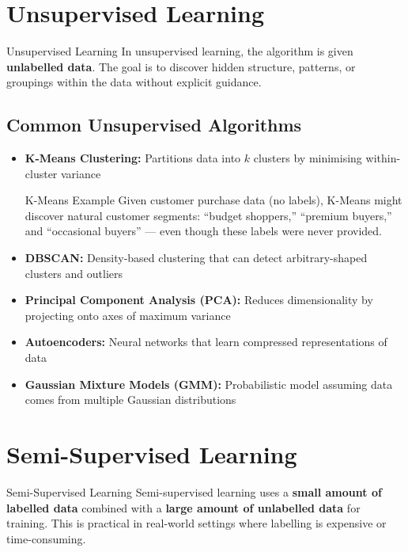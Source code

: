 \documentclass[12pt,a4paper]{report}
\begin{document}
\section{Unsupervised Learning}

\begin{defbox}{Unsupervised Learning}
In unsupervised learning, the algorithm is given \textbf{unlabelled data}. The goal is to discover hidden structure, patterns, or groupings within the data without explicit guidance.
\end{defbox}

\subsection{Common Unsupervised Algorithms}

\begin{itemize}
  \item \textbf{K-Means Clustering:} Partitions data into $k$ clusters by minimising within-cluster variance

    \begin{examplebox}{K-Means Example}
    Given customer purchase data (no labels), K-Means might discover natural customer segments: ``budget shoppers,'' ``premium buyers,'' and ``occasional buyers'' --- even though these labels were never provided.
    \end{examplebox}

  \item \textbf{DBSCAN:} Density-based clustering that can detect arbitrary-shaped clusters and outliers
  \item \textbf{Principal Component Analysis (PCA):} Reduces dimensionality by projecting onto axes of maximum variance
  \item \textbf{Autoencoders:} Neural networks that learn compressed representations of data
  \item \textbf{Gaussian Mixture Models (GMM):} Probabilistic model assuming data comes from multiple Gaussian distributions
\end{itemize}

\section{Semi-Supervised Learning}

\begin{defbox}{Semi-Supervised Learning}
Semi-supervised learning uses a \textbf{small amount of labelled data} combined with a \textbf{large amount of unlabelled data} for training. This is practical in real-world settings where labelling is expensive or time-consuming.
\end{defbox}
\end{document}
